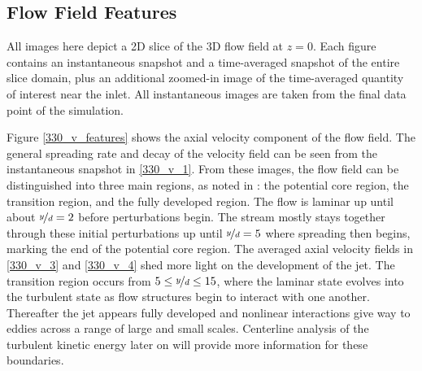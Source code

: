 \subsection{Flow Field Features}
All images here depict a 2D slice of the 3D flow field at $z=0$. Each figure contains an instantaneous snapshot and a time-averaged snapshot of the entire slice domain, plus an additional zoomed-in image of the time-averaged quantity of interest near the inlet. All instantaneous images are taken from the final data point of the simulation.

Figure \ref{330_v_features} shows the axial velocity component of the flow field. The general spreading rate and decay of the velocity field can be seen from the instantaneous snapshot in \ref{330_v_1}. From these images, the flow field can be distinguished into three main regions, as noted in \cite{iso_comp_1_ref_1}: the potential core region, the transition region, and the fully developed region. The flow is laminar up until about $\nicefrac{y}{d}=2$ before perturbations begin. The stream mostly stays together through these initial perturbations up until $\nicefrac{y}{d}=5$ where spreading then begins, marking the end of the potential core region. The averaged axial velocity fields in \ref{330_v_3} and \ref{330_v_4} shed more light on the development of the jet. The transition region occurs from $5 \leq \nicefrac{y}{d} \leq 15$, where the laminar state evolves into the turbulent state as flow structures begin to interact with one another. Thereafter the jet appears fully developed and nonlinear interactions give way to eddies across a range of large and small scales. Centerline analysis of the turbulent kinetic energy later on will provide more information for these boundaries.  

